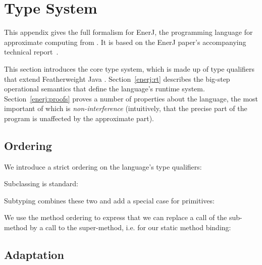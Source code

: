 \section{Type System}
\label{enerj:typesystem}

This appendix gives the full formalism for EnerJ, the programming language for
approximate computing from .
It is based on the EnerJ paper's accompanying technical
report~\cite{enerj-tr}.

This section introduces the core type system, which is made up of type
qualifiers that extend Featherweight Java \cite{fjava}. Section~\ref{enerj:rt}
describes the big-step operational semantics that define the language's runtime
system. Section~\ref{enerj:proofs} proves a number of properties about the language,
the most important of which is \emph{non-interference} (intuitively, that the
precise part of the program is unaffected by the approximate part).


\subsection{Ordering}

We introduce a strict ordering on the language's type qualifiers:

\vspace{0.5ex}
\ottdefnqorder{}
\vspace{2.0ex}


Subclassing is standard:

\vspace{0.5ex}
\ottdefnsubclassing{}
\vspace{2.0ex}


Subtyping combines these two and add a special case for primitives:

\vspace{0.5ex}
\ottdefnsubtyping{}
\vspace{2.0ex}


We use the method ordering to express that we can replace a call of
the sub-method by a call to the super-method, i.e. for our static
method binding:

\vspace{0.5ex}
\ottdefnmethodsubtyping{}
\vspace{2.0ex}


\subsection{Adaptation}

